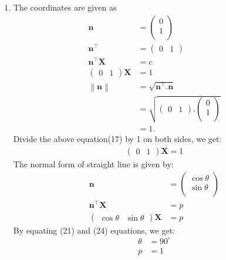 \documentclass[12pt]{article}
\providecommand{\norm}[1]{\left\lVert#1\right\rVert}
\newcommand{\myvec}[1]{\ensuremath{\begin{pmatrix}#1\end{pmatrix}}}
\let\vec\mathbf
\begin{document}
\begin{enumerate}
\item The coordinates are given as
	\begin{align}
	\vec{n}&=\myvec{0\\1\\}\\
	\vec{n}^\top&=\myvec{0 & 1}\\
	\vec{n}^\top \vec{X}&= c\\
	\myvec{0 & 1} \vec{X}&=1\\
	\norm{\vec{n}}&=\sqrt{\vec{n}^\top.\vec{n}}\\&=\sqrt{\myvec{0&1}.\myvec{0\\1\\}}\\&=1.	
\end{align}	
	Divide the above equation(17) by 1 on both sides, we get: 
	\begin{align}
	\myvec{0 & 1}\vec{X}=1
	\end{align}
	The normal form of straight line is given by:
	\begin{align}
	\vec{n}&=\myvec{\cos \theta\\\sin\theta\\}\\
	\vec{n}^\top \vec{X}&= p\\
	\myvec{\cos\theta & \sin\theta}\vec{X}&=p
	\end{align}
	By equating (21) and (24) equations, we get:
	\begin{align}
	\theta&=90^\circ\\
	p&=1
	\end{align}


\end{enumerate}
\end{document}
